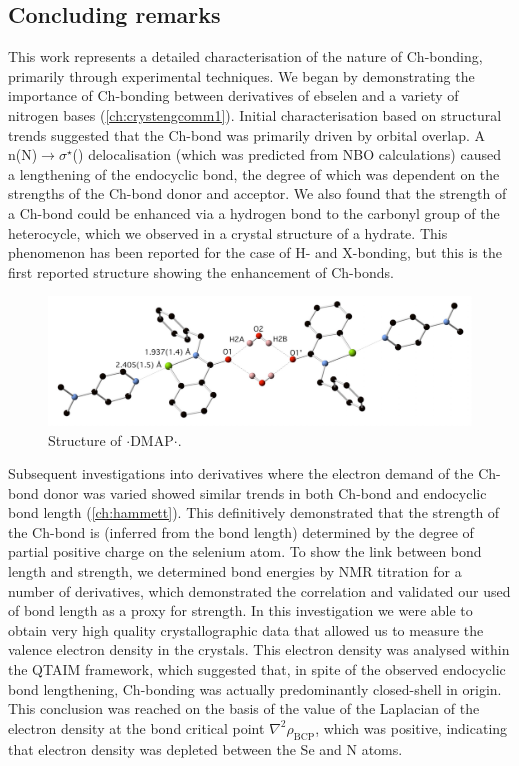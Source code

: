 \begin{refsection}
\chapter{Concluding remarks}\label{ch:conclusion}
This work represents a detailed characterisation of the nature of Ch-bonding, primarily through experimental techniques.
We began by demonstrating the importance of Ch-bonding between derivatives of ebselen  and a variety of nitrogen bases (\cref{ch:crystengcomm1}).
Initial characterisation based on structural trends suggested that the Ch-bond was primarily driven by orbital overlap.
A n(N)$ \rightarrow \sigma^{\star} $() delocalisation (which was predicted from NBO calculations) caused a lengthening of the endocyclic  bond, the degree of which was dependent on the strengths of the Ch-bond donor and acceptor.
We also found that the strength of a Ch-bond could be enhanced via a hydrogen bond to the carbonyl group of the heterocycle, which we observed in a crystal structure of a hydrate.
This phenomenon has been reported for the case of H- and X-bonding\autocite{Riel2019,Gilli1994}, but this is the first reported structure showing the enhancement of Ch-bonds.

\begin{figure}
    \centering
    \includegraphics[width=0.8\linewidth]{Figures/benzyl-dmap-hydrate.pdf}
    \caption{Structure of $ \cdot $DMAP$ \cdot $.}
  \end{figure}

Subsequent investigations into derivatives where the electron demand of the Ch-bond donor was varied showed similar trends in both Ch-bond and endocyclic bond length (\cref{ch:hammett}).
This definitively demonstrated that the strength of the Ch-bond is (inferred from the bond length) determined by the degree of partial positive charge on the selenium atom.
To show the link between bond length and strength, we determined bond energies by NMR titration for a number of derivatives, which demonstrated the correlation and validated our used of bond length as a proxy for strength.
In this investigation we were able to obtain very high quality crystallographic data that allowed us to measure the valence electron density in the crystals.
This electron density was analysed within the QTAIM framework, which suggested that, in spite of the observed endocyclic bond lengthening, Ch-bonding was actually predominantly closed-shell in origin.
This conclusion was reached on the basis of the value of the Laplacian of the electron density at the bond critical point $\nabla^2 \rho_{\text{BCP}}$, which was positive, indicating that electron density was depleted between the Se and N atoms.


\end{refsection}
